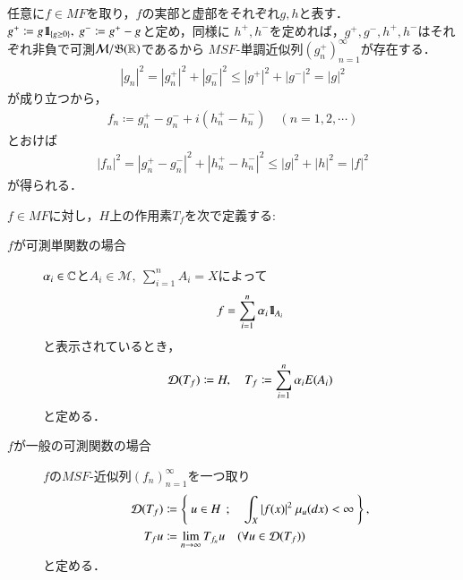 	\begin{prf}
		任意に$f \in MF$を取り，$f$の実部と虚部をそれぞれ$g,h$と表す．
		$g^+ \coloneqq g \mbox{1}\hspace{-0.25em}\mbox{l}_{\{g \geq 0\}},\ g^- \coloneqq g^+ - g$と定め，同様に
		$h^+,h^-$を定めれば，$g^+,g^-,h^+,h^-$はそれぞれ非負で可測$\mathcal{M}/\mathfrak{B}(\mathbb{R})$であるから
		$MSF$-単調近似列$\left( g^+_n \right)_{n=1}^{\infty}$が存在する．
		\begin{align}
			\left| g_n \right|^2 = \left| g^+_n \right|^2 + \left| g^-_n \right|^2
			\leq \left| g^+ \right|^2 + \left| g^- \right|^2
			= |g|^2
		\end{align}
		が成り立つから，
		\begin{align}
			f_n \coloneqq g^+_n - g^-_n + i\left( h^+_n - h^-_n \right)
			\quad (n=1,2,\cdots)
		\end{align}
		とおけば
		\begin{align}
			|f_n|^2 = \left| g^+_n - g^-_n \right|^2 + \left| h^+_n - h^-_n \right|^2
			\leq |g|^2 + |h|^2
			= |f|^2
		\end{align}
		が得られる．
		\QED
	\end{prf}
	
	\begin{screen}
		\begin{dfn}[可測関数で導入する作用素]
			$f \in MF$に対し，$H$上の作用素$T_f$を次で定義する:
			\begin{description}
				\item[$f$が可測単関数の場合]
					$\alpha_i \in \mathbb{C}$と$A_i \in \mathcal{M},\ \sum_{i=1}^{n} A_i = X$によって
					\begin{align}
						f = \sum_{i=1}^{n} \alpha_i \mbox{1}\hspace{-0.25em}\mbox{l}_{A_i}
					\end{align}
					と表示されているとき，
					\begin{align}
						\Dom{T_f} \coloneqq H,\quad T_f \coloneqq \sum_{i=1}^{n} \alpha_i E(A_i)
						\label{eq:dfn_operator_introduced_by_measurable_functions}
					\end{align}
					と定める．
				
				\item[$f$が一般の可測関数の場合]
					$f$の$MSF$-近似列$(f_n)_{n=1}^{\infty}$を一つ取り
					\begin{align}
						\Dom{T_f} &\coloneqq \Set{u \in H}{\int_X |f(x)|^2\ \mu_u(dx) < \infty}, \label{eq:dfn_operator_introduced_by_measurable_functions_3} \\
						T_f u &\coloneqq \lim_{n \to \infty} T_{f_n} u \quad (\forall u \in \Dom{T_f} )
						\label{eq:dfn_operator_introduced_by_measurable_functions_2}
					\end{align}
					と定める．
			\end{description}
			\label{dfn:operator_introduced_by_measurable_functions}
		\end{dfn}
	\end{screen}
	
